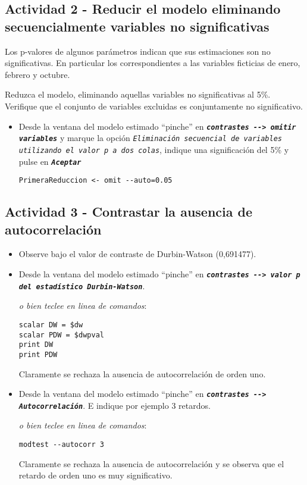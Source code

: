 \documentclass[11pt]{article}
\begin{document}
\subsection{Actividad 2 - Reducir el modelo eliminando secuencialmente variables no significativas}
\label{sec:org3646755}

Los p-valores de algunos parámetros indican que sus estimaciones son
no significativas. En particular los correspondientes a las variables
ficticias de enero, febrero y octubre.

Reduzca el modelo, eliminando aquellas variables no significativas al
5\%. Verifique que el conjunto de variables excluidas es conjuntamente
no significativo.

\begin{itemize}
\item Desde la ventana del modelo estimado ``pinche'' en \textbf{\emph{\texttt{contrastes -{}-{}>
  omitir variables}}} y marque la opción \emph{\texttt{Eliminación secuencial de
  variables utilizando el valor p a dos colas}}, indique una
significación del 5\% y pulse en \textbf{\emph{\texttt{Aceptar}}}
{\vspace{0pt} \footnotesize \color{gray!70!black}
\begin{verbatim}
PrimeraReduccion <- omit --auto=0.05
\end{verbatim}
}
\end{itemize}


\subsection{Actividad 3 - Contrastar la ausencia de autocorrelación}
\label{sec:org027957e}

\begin{itemize}
\item Observe bajo el valor de contraste de Durbin-Watson (0,691477).

\item Desde la ventana del modelo estimado ``pinche'' en \textbf{\emph{\texttt{contrastes -{}-{}>
  valor p del estadístico Durbin-Watson}}}. 
{\vspace{0pt} \footnotesize \color{gray!70!black}
\emph{o bien teclee en linea de comandos}:
\begin{verbatim}
scalar DW = $dw
scalar PDW = $dwpval
print DW
print PDW
\end{verbatim}
}

Claramente se rechaza la ausencia de autocorrelación de orden uno.

\item Desde la ventana del modelo estimado ``pinche'' en \textbf{\emph{\texttt{contrastes -{}-{}>
  Autocorrelación}}}. E indique por ejemplo 3 retardos. 
{\vspace{0pt} \footnotesize \color{gray!70!black}
\emph{o bien teclee en linea de comandos}:
\begin{verbatim}
modtest --autocorr 3
\end{verbatim}
}

Claramente se rechaza la ausencia de autocorrelación y se observa
que el retardo de orden uno es muy significativo.
\end{itemize}
\end{document}
